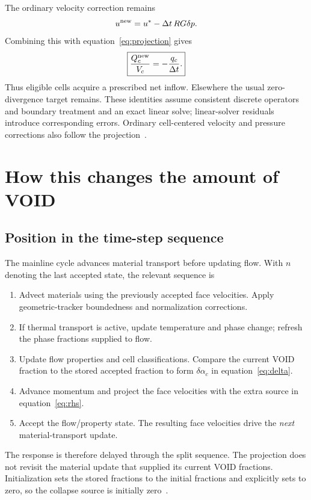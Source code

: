 \documentclass[11pt,letterpaper]{article}
\newcommand{\code}[1]{\texttt{\detokenize{#1}}}
\begin{document}
The ordinary velocity correction remains
\begin{equation}
 u^{\rm new}=u^*-\Delta t\,RG\delta p.
\end{equation}
Combining this with equation~\eqref{eq:projection} gives
\begin{equation}
 \boxed{\frac{Q_c^{\rm new}}{V_c}=-\frac{q_c}{\Delta t}.}
 \label{eq:divergence}
\end{equation}
Thus eligible cells acquire a prescribed net inflow. Elsewhere the usual
zero-divergence target remains. These identities assume consistent discrete
operators and boundary treatment and an exact linear solve; linear-solver
residuals introduce corresponding errors. Ordinary cell-centered velocity
and pressure corrections also follow the projection~\cite{projection}.

\section{How this changes the amount of VOID}

\subsection{Position in the time-step sequence}

The mainline cycle advances material transport before updating flow. With
$n$ denoting the last accepted state, the relevant sequence is~\cite{cycle,flow}
\begin{enumerate}
\item Advect materials using the previously accepted face velocities.
  Apply geometric-tracker boundedness and normalization corrections.
\item If thermal transport is active, update temperature and phase change;
  refresh the phase fractions supplied to flow.
\item Update flow properties and cell classifications. Compare the current
  VOID fraction to the stored accepted fraction to form
  $\delta\alpha_c$ in equation~\eqref{eq:delta}.
\item Advance momentum and project the face velocities with the extra
  source in equation~\eqref{eq:rhs}.
\item Accept the flow/property state. The resulting face velocities drive
  the \emph{next} material-transport update.
\end{enumerate}

The response is therefore delayed through the split sequence. The projection
does not revisit the material update that supplied its current VOID fractions.
Initialization sets the stored fractions to the initial fractions and
explicitly sets \code{void_delta_cc} to zero, so the collapse source is
initially zero~\cite{props}.
\end{document}
